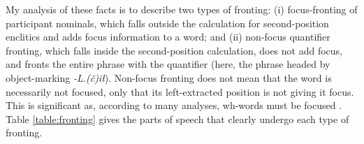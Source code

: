 \begin{comment}
This same pattern with respect to \textit{ʔuuš} is present in Sapir's original data.\footnotemark{} \textit{ʔuušił}, which is \textit{ʔuuš} `some' with the object marking \textit{-L.(č)ił} attached, behaves the same way in my data. \textit{ʔuušił} may be fronted without the second-position enclitics, as already seen in (\ref{ex:uushilfront}), or it may then take the enclitics, as in (\ref{ex:uushilfrontclitic}) below. I could not find any \textit{ʔuušił} fronting in the Sapir-Thomas texts, so \textit{ʔuušił} fronting may represent a change in the language in the intervening generations.

\footnotetext{\noindent With the clitic complex:

\ex~ \label{ex:uushfrontcliticNT}
\begingl
\glpreamble ʔuušʔaƛ maqw̓in. //
\gla ʔuuš=!aƛ maq-w̓in  //
\glb some=\textsc{now} tie-middle //
\glft `Some are tied about the middle.' \citep[p.~70]{sapir1955} //
\endgl
\xe

\noindent Without the clitic complex:

\ex~ \label{ex:uushfrontnocliticNT}
\begingl
\glpreamble ʔuuš saac̓inłšiʔaƛƛaa ʔaḥʔaa ƛ̓acʔii ƛ̓isitʔi sac̓up. //
\gla ʔuuš saac̓inł-šiƛ=!aƛ=ƛaa ʔaḥʔaa ƛ̓ac=ʔiˑ ƛ̓isit=ʔiˑ sac̓up  //
\glb some seafood.feast(?)-\textsc{mo}=\textsc{now}=also \textsc{dtop} fat=\textsc{art} white=\textsc{art} spring.salmon //
\glft `Some would start feasting with the fat, white-bodied tyee salmon.' \citep[p.~22]{sapir1955} //
\endgl
\xe
}

\ex \label{ex:uushilfrontclitic}
\begingl
\glpreamble ʔuušiłqaˑč̓a n̓aacsa. //
\gla ʔuuš-L.(č)ił=qaˑč̓a n̓aacsa  //
\glb some-\textsc{do.to}=\textsc{infr.3} see.\textsc{cv} //
\glft `He must've seen something.' (\textbf{C}, \textit{tupaat} Julia Lucas) //
\endgl
\xe

I have no examples of the strong quantifier \textit{hišuk} `all' fronting without the second-position complex, and it is possibly ungrammatical. The version of the strong quantifier in the Sapir-Thomas texts, \textit{č̓uučk}, does not occur in a fronting environment where the enclitics unambiguously fall on the following predicate. (That is, in a case where the enclitic could not be a singly null-marked third person morpheme.)
\end{comment}

My analysis of these facts is to describe two types of fronting: (i) focus-fronting of participant nominals, which falls outside the calculation for second-position enclitics and adds focus information to a word; and (ii) non-focus quantifier fronting, which falls inside the second-position calculation, does not add focus, and fronts the entire phrase with the quantifier (here, the phrase headed by object-marking \textit{-L.(č)ił}). Non-focus fronting does not mean that the word is necessarily not focused, only that its left-extracted position is not giving it focus. This is significant as, according to many analyses, wh-words must be focused \citet[Chapter 5]{lambrecht1996}. Table \ref{table:fronting} gives the parts of speech that clearly undergo each type of fronting.

